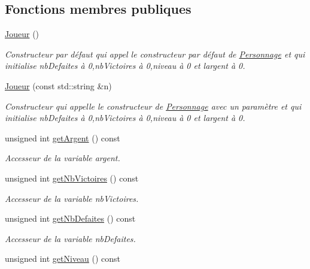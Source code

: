 \subsection*{Fonctions membres publiques}
\begin{DoxyCompactItemize}
\item 
\mbox{\label{class_joueur_add6c98be3020651d84f6d75ccc1d867e}} 
\hyperlink{class_joueur_add6c98be3020651d84f6d75ccc1d867e}{Joueur} ()
\begin{DoxyCompactList}\small\item\em Constructeur par défaut qui appel le constructeur par défaut de \hyperlink{class_personnage}{Personnage} et qui initialise nb\+Defaites à 0,nb\+Victoires à 0,niveau à 0 et l\textquotesingle{}argent à 0. \end{DoxyCompactList}\item 
\hyperlink{class_joueur_a38f10c26b532efd5b461a1cca84f4cdd}{Joueur} (const std\+::string \&n)
\begin{DoxyCompactList}\small\item\em Constructeur qui appelle le constructeur de \hyperlink{class_personnage}{Personnage} avec un paramètre et qui initialise nb\+Defaites à 0,nb\+Victoires à 0,niveau à 0 et l\textquotesingle{}argent à 0. \end{DoxyCompactList}\item 
unsigned int \hyperlink{class_joueur_ae06420103fca19bb0dca8ba9ed261bd6}{get\+Argent} () const
\begin{DoxyCompactList}\small\item\em Accesseur de la variable argent. \end{DoxyCompactList}\item 
unsigned int \hyperlink{class_joueur_ae411355727ca5cd183183ba992693180}{get\+Nb\+Victoires} () const
\begin{DoxyCompactList}\small\item\em Accesseur de la variable nb\+Victoires. \end{DoxyCompactList}\item 
unsigned int \hyperlink{class_joueur_a82a78911f157c2fee8a7587064a4ce25}{get\+Nb\+Defaites} () const
\begin{DoxyCompactList}\small\item\em Accesseur de la variable nb\+Defaites. \end{DoxyCompactList}\item 
unsigned int \hyperlink{class_joueur_abec464c3958916f951e19ba5e12d0dbc}{get\+Niveau} () const

\end{DoxyCompactItemize}
